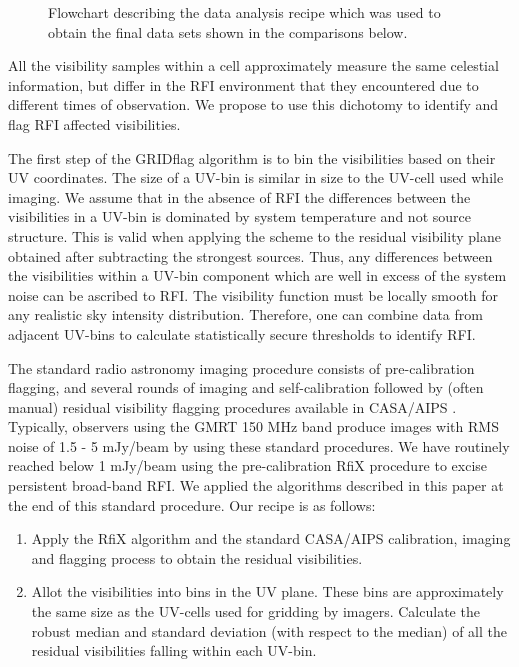 \documentclass[twocolumn]{aastex61}
\begin{document}
{\begin{figure}[htbp]
   \caption{Flowchart describing the data
   analysis recipe which was used to obtain the final data sets shown in the
   comparisons below.}
   \label{fig:flowchart}
\end{figure}


All the visibility samples within a cell approximately measure the same
celestial information, but differ in the RFI environment that they encountered
due to different times of observation.  We propose to use this dichotomy to
identify and flag RFI affected visibilities.

The first step of the GRIDflag algorithm is to bin the visibilities
based on their UV coordinates. The size of a UV-bin is similar in size to the
UV-cell used while imaging. We assume that in the absence of RFI the
differences between the visibilities in a UV-bin is dominated by system
temperature and not source structure. This is valid when applying the
scheme to the residual visibility plane obtained after subtracting the strongest
sources. Thus, any differences between the visibilities within a UV-bin
component which are well in excess of the system noise can be ascribed to RFI.
The visibility function must be locally smooth for any realistic sky intensity
distribution.  Therefore, one can combine data from adjacent UV-bins to
calculate statistically secure thresholds to identify RFI.

The standard radio astronomy imaging procedure consists of pre-calibration
flagging, and several rounds of imaging and self-calibration followed by (often
manual) residual visibility flagging procedures available in CASA/AIPS
\citep{mcmullin2007casa, greisen2003aips}.  Typically, observers using the GMRT
150 MHz band produce images with RMS noise of 1.5 - 5 mJy/beam by using these
standard procedures. We have routinely reached below 1 mJy/beam using the
pre-calibration RfiX procedure \citep{athreya_new_2009} to excise persistent
broad-band RFI. We applied the algorithms described in this paper at the end of
this standard procedure.  Our recipe is as follows:

\begin{enumerate}
   \item Apply the RfiX algorithm and the standard CASA/AIPS calibration, imaging
      and flagging process to obtain the residual visibilities.

   \item Allot the visibilities into bins in the UV plane. These bins are
      approximately the same size as the UV-cells used for gridding by imagers.
      Calculate the robust median and standard deviation (with respect to the
      median) of all the residual visibilities falling within each UV-bin.


\end{enumerate}}
\end{document}
